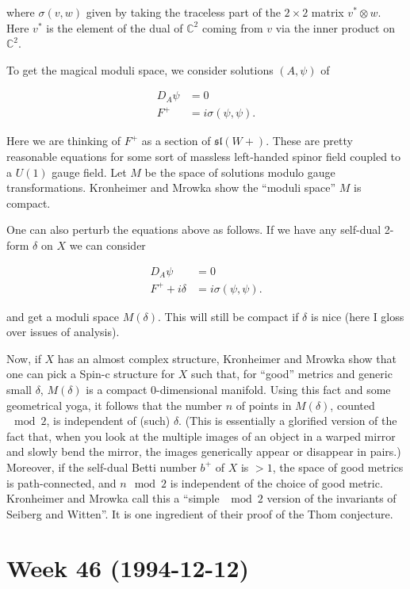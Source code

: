 \documentclass{article}
\begin{document}
where \(\sigma(v,w)\) given by taking the traceless part of the
\(2\times2\) matrix \(v^* \otimes w\). Here \(v^*\) is the element of
the dual of \(\mathbb{C}^2\) coming from \(v\) via the inner product on
\(\mathbb{C}^2\).

To get the magical moduli space, we consider solutions \((A,\psi)\) of

\[\begin{aligned}D_A\psi &= 0 \\ F^+ &= i\sigma(\psi,\psi).\end{aligned}\]

Here we are thinking of \(F^+\) as a section of \(\mathfrak{sl}(W+)\).
These are pretty reasonable equations for some sort of massless
left-handed spinor field coupled to a \(U(1)\) gauge field. Let \(M\) be
the space of solutions modulo gauge transformations. Kronheimer and
Mrowka show the ``moduli space'' \(M\) is compact.

One can also perturb the equations above as follows. If we have any
self-dual 2-form \(\delta\) on \(X\) we can consider

\[\begin{aligned}D_A\psi &= 0 \\ F^+ +i\delta &= i\sigma(\psi,\psi).\end{aligned}\]

and get a moduli space \(M(\delta)\). This will still be compact if
\(\delta\) is nice (here I gloss over issues of analysis).

Now, if \(X\) has an almost complex structure, Kronheimer and Mrowka
show that one can pick a Spin-c structure for \(X\) such that, for
``good'' metrics and generic small \(\delta\), \(M(\delta)\) is a
compact 0-dimensional manifold. Using this fact and some geometrical
yoga, it follows that the number \(n\) of points in \(M(\delta)\),
counted \(\mod 2\), is independent of (such) \(\delta\). (This is
essentially a glorified version of the fact that, when you look at the
multiple images of an object in a warped mirror and slowly bend the
mirror, the images generically appear or disappear in pairs.) Moreover,
if the self-dual Betti number \(b^+\) of \(X\) is \(> 1\), the space of
good metrics is path-connected, and \(n \mod 2\) is independent of the
choice of good metric. Kronheimer and Mrowka call this a ``simple
\(\mod 2\) version of the invariants of Seiberg and Witten''. It is one
ingredient of their proof of the Thom conjecture.
\hypertarget{week-46-1994-12-12}{%
\section{Week 46 (1994-12-12)}\label{week-46-1994-12-12}}
\end{document}

